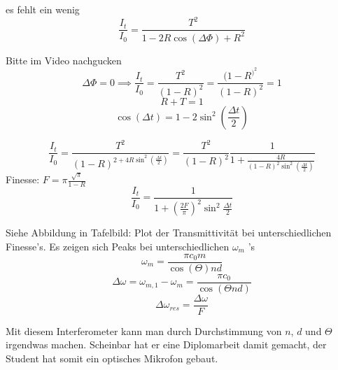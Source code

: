 \documentclass[a4paper]{article}
\begin{document}
es fehlt ein wenig
\implies 
\[ \frac{I_{t}}{I_{0}}=\frac{T^{2}}{1-2R\cos(\Delta\Phi)+R^{2}} \]

Bitte im Video nachgucken
\[ \Delta\Phi=0 \implies \frac{I_{t}}{I_{0}}=\frac{T^{2}}{(1-R)^{2}}=\frac{(1-R^)^{2}}{(1-R)^{2}}=1\]
\[ R+T=1 \]
\[ \cos(\Delta t) =1-2\sin^{2}(\frac{\Delta t}{2})\]

\[ \frac{I_{t}}{I_{0}}=\frac{T^{2}}{(1-R)^{2+4R\sin^{2}(\frac{\Delta t}{2})}}=\frac{T^{2}}{(1-R)^{2}} \frac{1}{1+\frac{4R}{(1-R)^{2}\sin^{2}(\frac{\Delta t}{2})}} \]
Finesse: $F=\pi \frac{\sqrt{\pi} }{1-R}$ 
\[ \frac{I_{t}}{I_{0}}=\frac{1}{1+(\frac{2F}{\pi})^{2}\sin^2 \frac{\Delta t}{2}} \]

Siehe Abbildung in Tafelbild: Plot der Transmittivität bei unterschiedlichen Finesse's. Es zeigen sich Peaks bei unterschiedlichen $\omega_{m}$ 's
\[ \omega_{m}=\frac{\pi c_{0}m}{\cos(\Theta)nd} \]
\[ \Delta \omega = \omega_{m,1}-\omega_{m}=\frac{\pi c_{0}}{\cos(\Theta nd)}\]
\[ \Delta\omega_{res}=\frac{\Delta\omega}{F} \]

Mit diesem Interferometer kann man durch Durchstimmung von $n$,  $d$ und  $\Theta$ irgendwas machen.
Scheinbar hat er eine Diplomarbeit damit gemacht, der Student hat somit ein optisches Mikrofon gebaut.
\end{document}
